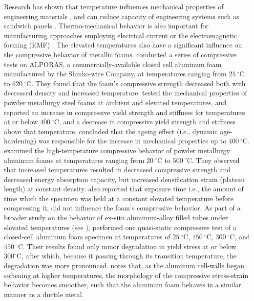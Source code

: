\documentclass[review]{elsarticle}
\begin{document}
Research has shown that temperature influences mechanical properties of engineering materials \cite{richeton_influence_2006}, and can reduce capacity of engineering systems such as sandwich panels \cite{zhang_mode_2020}. Thermo-mechanical behavior is also important for manufacturing approaches employing electrical current or the electromagnetic forming (EMF) \cite{thomas_theory_2007}. The elevated temperatures also have a significant influence on the compressive behavior of metallic foams. \cite{Aly2007} conducted a series of compressive tests on ALPORAS, a commercially-available closed cell aluminum foam manufactured by the Shinko-wire Company, at temperatures ranging from $25~^{\circ}\mathrm{C}$ to $620~^{\circ}\mathrm{C}$. They found that the foam's compressive strength decreased both with decreased density and increased temperature. \cite{BekozOktay2014} tested the mechanical properties of powder metallurgy steel foams at ambient and elevated temperatures, and reported an increase in compressive yield strength and stiffness for temperatures at or below $400~^{\circ}\mathrm{C}$, and a decrease in compressive yield strength and stiffness above that temperature. \cite{BekozOktay2014} concluded that the ageing effect (i.e., dynamic age-hardening) was responsible for the increase in mechanical properties up to $400~^{\circ}\mathrm{C}$. \cite{Kovacicetal2016} examined the high-temperature compressive behavior of powder metallurgy aluminum foams at temperatures ranging from $20~^{\circ}\mathrm{C}$ to $500~^{\circ}\mathrm{C}$. They observed that increased temperatures resulted in decreased compressive strength and decreased energy absorption capacity, but increased densification strain (plateau length) at constant density. \cite{Kovacicetal2016} also reported that exposure time i.e., the amount of time which the specimen was held at a constant elevated temperature before compressing it, did not influence the foam's compressive behavior. As part of a broader study on the behavior of ex-situ aluminum-alloy filled tubes under elevated temperatures (see \cite{Movahedi:2017}), \cite{Linul:2017} performed one quasi-static compressive test of a closed-cell aluminum foam specimen at temperatures of $25~^{\circ}\mathrm{C}$, $150~^{\circ}\mathrm{C}$, $300~^{\circ}\mathrm{C}$, and $450~^{\circ}\mathrm{C}$. Their results found only minor degradation in yield stress at or below $300^{\circ}\mathrm{C}$, after which, because it passing through its transition temperature, the degradation was more pronounced. \cite{Linul:2017} notes that, as the aluminum cell-walls began softening at higher temperatures, the morphology of the compressive stress-strain behavior becomes smoother, such that the aluminum foam behaves in a similar manner as a ductile metal.
\end{document}
